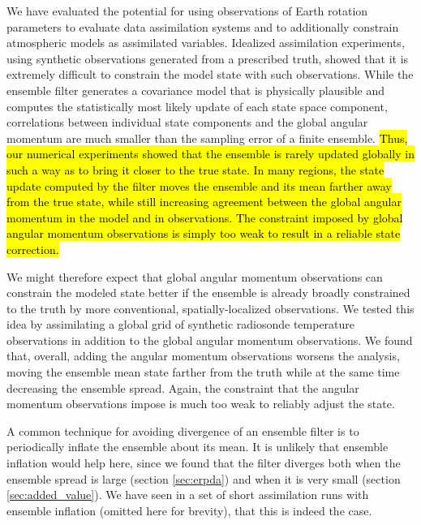 
We have evaluated the potential for using observations of Earth rotation parameters to evaluate data assimilation systems and to additionally constrain atmospheric models as assimilated variables.  
Idealized assimilation experiments, using synthetic observations generated from a prescribed truth, showed that it is extremely difficult to constrain the model state with such observations.  
While the ensemble filter generates a covariance model that is physically plausible and computes the statistically most likely update of each state space component, correlations between individual state components and the global angular momentum are much smaller than the sampling error of a finite ensemble. 
\hl{Thus, our numerical experiments showed that the ensemble is rarely updated globally in such a way as to bring it closer to the true state. 
In many regions, the state update computed by the filter moves the ensemble and its mean farther away from the true state, while still increasing agreement between the global angular momentum in the model and in observations. 
The constraint imposed by global angular momentum observations is simply too weak to result in a reliable state correction.} 

We might therefore expect that global angular momentum observations can constrain the modeled state better if the ensemble is already broadly constrained to the truth by more conventional, spatially-localized observations. 
We tested this idea by assimilating a global grid of synthetic radiosonde temperature observations in addition to the global angular momentum observations. 
We found that, overall, adding the angular momentum observations worsens the analysis, moving the ensemble mean state farther from the truth while at the same time decreasing the ensemble spread.
Again, the constraint that the angular momentum observations impose is much too weak to reliably adjust the state.

A common technique for avoiding divergence of an ensemble filter is to periodically inflate the ensemble about its mean. 
It is unlikely that ensemble inflation would help here, since we found that the filter diverges both when the ensemble spread is large (section \ref{sec:erpda}) and when it is very small (section \ref{sec:added_value}). 
We have seen in a set of short assimilation runs with ensemble inflation (omitted here for brevity), that this is indeed the case. 


